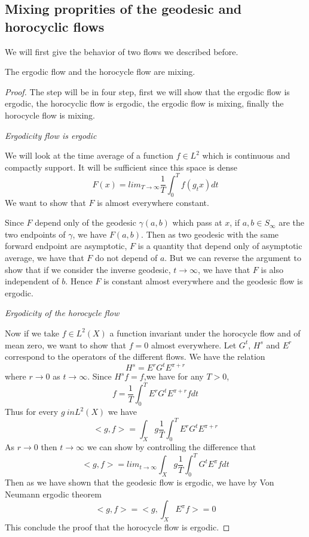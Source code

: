 \subsection{Mixing proprities of the geodesic and horocyclic flows}

We will first give the behavior of two flows we described before.

\begin{thm}
The ergodic flow and the horocycle flow are mixing.
\end{thm}

\cite{Mcmullen1998HyperbolicM}

\begin{proof}
The step will be in four step, first we will show that the ergodic flow is ergodic, the horocyclic flow is ergodic, the ergodic flow is mixing, finally the horocycle flow is mixing.

\emph{Ergodicity flow is ergodic}

We will look at the time average of a function $f \in L^2$ which is continuous and compactly support. It will be sufficient since this space is dense \[
F(x) = lim_{T \to \infty} \frac{1}{T} \int_0^T f(g_t x)dt
\]
We want to show that $F$ is almost everywhere constant.

Since $F$ depend only of the geodesic $\gamma(a,b)$ which pass at $x$, if $a,b \in S_\infty$ are the two endpoints of $\gamma$, we have $F(a,b)$.
Then as two geodesic with the same forward endpoint are asymptotic, $F$ is a quantity that depend only of asymptotic average, we have that $F$ do not depend of $a$.
But we can reverse the argument to show that if we consider the inverse geodesic, $t \to \infty$, we have that $F$ is also independent of $b$. Hence $F$ is constant almost everywhere and the geodesic flow is ergodic.

\emph{Ergodicity of the horocycle flow}

Now if we take $f \in L^2(X)$ a function invariant under the horocycle flow and of mean zero, we want to show that $f=0$ almost everywhere.
Let $G^t$, $H^s$ and $E^r$ correspond to the operators of the different flows. We have the relation \[
H^s=E^r G^t E^{\pi+r}
\]
where $r \to 0$ as $t \to \infty$. Since $H^s f=f$,we have for any $T>0$,\[
f=\frac{1}{T} \int_0^T E^r G^t E^{\pi+r} f dt
\]
Thus for every $g\ in L^2(X)$ we have \[
<g,f> = \int_X g \frac{1}{T} \int_0^T E^r G^t E^{\pi+r}
\]
As $r \to 0$ then $t \to \infty$ we can show by controlling the difference that \[
<g,f> = lim_{t \to \infty} \int_X g \frac{1}{T} \int_0^T G^t E^{\pi} f dt
\]
Then as we have shown that the geodesic flow is ergodic, we have by Von Neumann ergodic theorem\[
<g,f> = <g,\int_X E^{\pi} f> =0
\]
This conclude the proof that the horocycle flow is ergodic.


\end{proof}
